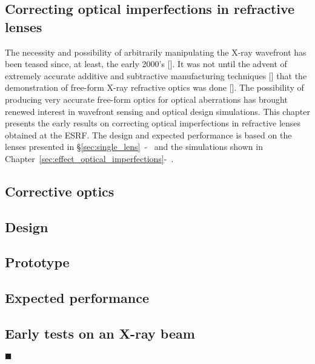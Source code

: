 \begin{refsection}
\chapter{Correcting optical imperfections in refractive lenses}\label{sec:corrections}

The necessity and possibility of arbitrarily manipulating the X-ray wavefront has been teased since, at least, the early 2000's [\cite{Chubar1999, Chubar2001b}]. It was not until the advent of extremely accurate additive and subtractive manufacturing techniques [\cite{Stohr2015, Polikarpov2016, Petrov2017, Roth2018, Sanli2018, Seiboth2019, Antipov2020, Medvedskaya2020}] that the demonstration of free-form X-ray refractive optics was done [\cite{Seiboth2017,Seiboth2020}]. The possibility of producing very accurate free-form optics for optical aberrations has brought renewed interest in wavefront sensing and optical design simulations. This chapter presents the early results on correcting optical imperfections in refractive lenses obtained at the ESRF. The design and expected performance is based on the lenses presented in \S\ref{sec:single_lens}~-~\textit{} and the simulations shown in Chapter~\ref{sec:effect_optical_imperfections}-~\textit{}.


\section{Corrective optics}
\section{Design}\label{sec:design}

\section{Prototype}\label{sec:prototype}

\section{Expected performance}\label{sec:performance}

\section{Early tests on an X-ray beam}\label{sec:prototype_testing}




$\blacksquare$
\printbibliography[heading=subbibliography]
\end{refsection}
